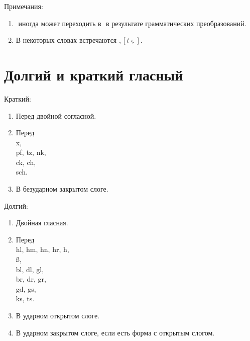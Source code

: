 \documentclass[oneside]{book}
\begin{document}
    Примечания:
    \begin{enumerate}
        \item
        \begin{math}
            [x]
        \end{math}
        иногда может переходить в
        \begin{math}
            [\zeta]
        \end{math}
        в результате грамматических преобразований.

        \item В некоторых словах встречаются
        \begin{math}
            [\varsigma], [t\varsigma]
        \end{math}.
    \end{enumerate}

    \section{Долгий и краткий гласный}
    Краткий:
    \begin{enumerate}
        \item Перед двойной согласной.

        \item Перед \\
        x, \\
        pf, tz, nk, \\
        ck, ch, \\
        sch.

        \item В безударном закрытом слоге.
    \end{enumerate}

    Долгий:
    \begin{enumerate}
        \item Двойная гласная.

        \item Перед \\
        hl, hm, hn, hr, h, \\
        \ss, \\
        bl, dl, gl, \\
        br, dr, gr, \\
        gd, gs, \\
        ks, ts.

        \item В ударном открытом слоге.

        \item В ударном закрытом слоге, если
        есть форма с открытым слогом.
    \end{enumerate}
\end{document}
